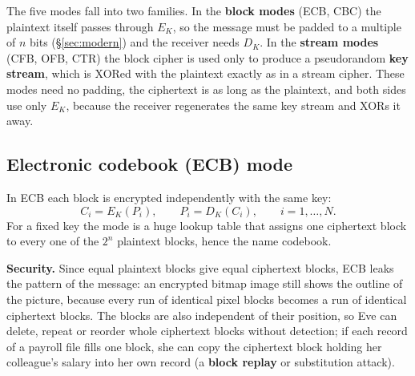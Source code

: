 The five modes fall into two families. In the \textbf{block modes} (ECB, CBC) the plaintext itself passes through $E_K$, so the message must be padded to a multiple of $n$ bits (\S\ref{sec:modern}) and the receiver needs $D_K$. In the \textbf{stream modes} (CFB, OFB, CTR) the block cipher is used only to produce a pseudorandom \textbf{key stream}, which is XORed with the plaintext exactly as in a stream cipher. These modes need no padding, the ciphertext is as long as the plaintext, and both sides use only $E_K$, because the receiver regenerates the same key stream and XORs it away.

\subsection{Electronic codebook (ECB) mode \new}

In ECB each block is encrypted independently with the same key:
\[
C_i = E_K(P_i), \qquad P_i = D_K(C_i), \qquad i = 1, \dots, N .
\]
For a fixed key the mode is a huge lookup table that assigns one ciphertext block to every one of the $2^n$ plaintext blocks, hence the name codebook.

\begin{center}
\end{center}

\textbf{Security.} Since equal plaintext blocks give equal ciphertext blocks, ECB leaks the pattern of the message: an encrypted bitmap image still shows the outline of the picture, because every run of identical pixel blocks becomes a run of identical ciphertext blocks. The blocks are also independent of their position, so Eve can delete, repeat or reorder whole ciphertext blocks without detection; if each record of a payroll file fills one block, she can copy the ciphertext block holding her colleague's salary into her own record (a \textbf{block replay} or substitution attack).

